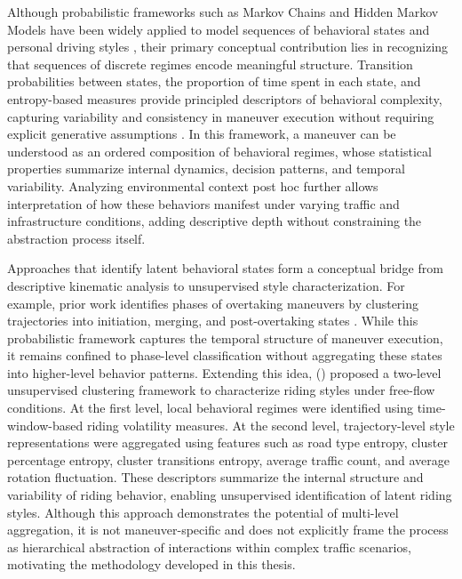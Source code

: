 Although probabilistic frameworks such as Markov Chains and Hidden Markov Models have been widely applied to model sequences of behavioral states \cite{khattak_analysis_2017, yin_extracting_2022, he_multi-scenario_2025} and personal driving styles \cite{meng_human_2006,zou_multivariate_2022}, their primary conceptual contribution lies in recognizing that sequences of discrete regimes encode meaningful structure. Transition probabilities between states, the proportion of time spent in each state, and entropy-based measures provide principled descriptors of behavioral complexity, capturing variability and consistency in maneuver execution without requiring explicit generative assumptions \cite{vegetabile_estimating_2019}. In this framework, a maneuver can be understood as an ordered composition of behavioral regimes, whose statistical properties summarize internal dynamics, decision patterns, and temporal variability. Analyzing environmental context post hoc further allows interpretation of how these behaviors manifest under varying traffic and infrastructure conditions, adding descriptive depth without constraining the abstraction process itself.

Approaches that identify latent behavioral states form a conceptual bridge from descriptive kinematic analysis to unsupervised style characterization. For example, prior work identifies phases of overtaking maneuvers by clustering trajectories into initiation, merging, and post-overtaking states \cite{mohammed_characterization_2019}. While this probabilistic framework captures the temporal structure of maneuver execution, it remains confined to phase-level classification without aggregating these states into higher-level behavior patterns.
Extending this idea, \citeauthor{bachir_identifying_2025} (\citeyear{bachir_identifying_2025}) proposed a two-level unsupervised clustering framework to characterize riding styles under free-flow conditions. At the first level, local behavioral regimes were identified using time-window-based riding volatility measures. At the second level, trajectory-level style representations were aggregated using features such as road type entropy, cluster percentage entropy, cluster transitions entropy, average traffic count, and average rotation fluctuation. These descriptors summarize the internal structure and variability of riding behavior, enabling unsupervised identification of latent riding styles. Although this approach demonstrates the potential of multi-level aggregation, it is not maneuver-specific and does not explicitly frame the process as hierarchical abstraction of interactions within complex traffic scenarios, motivating the methodology developed in this thesis.

